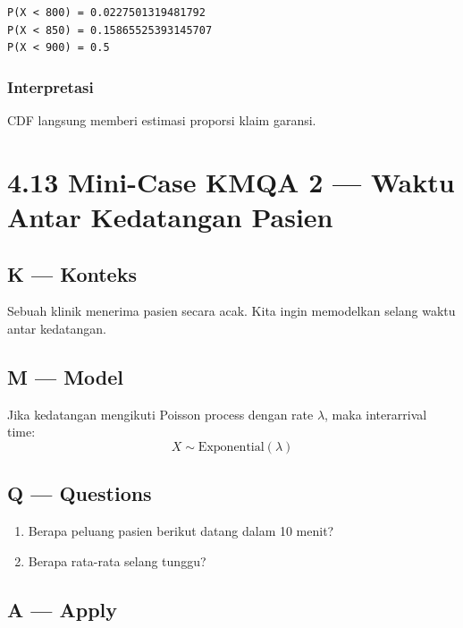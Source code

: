 \documentclass[
  letterpaper,
  DIV=11,
  numbers=noendperiod]{scrreprt}
\providecommand{\tightlist}{%
  \setlength{\itemsep}{0pt}\setlength{\parskip}{0pt}}
\begin{document}
\begin{verbatim}
P(X < 800) = 0.0227501319481792
P(X < 850) = 0.15865525393145707
P(X < 900) = 0.5
\end{verbatim}

\subsubsection{Interpretasi}\label{interpretasi-15}

CDF langsung memberi estimasi proporsi klaim garansi.

\section{4.13 Mini-Case KMQA 2 --- Waktu Antar Kedatangan
Pasien}\label{mini-case-kmqa-2-waktu-antar-kedatangan-pasien}

\subsection{K --- Konteks}\label{k-konteks-29}

Sebuah klinik menerima pasien secara acak. Kita ingin memodelkan selang
waktu antar kedatangan.

\subsection{M --- Model}\label{m-model-29}

Jika kedatangan mengikuti Poisson process dengan rate \(\lambda\), maka
interarrival time: \[
X \sim \mathrm{Exponential}(\lambda)
\]

\subsection{Q --- Questions}\label{q-questions-29}

\begin{enumerate}
\def\labelenumi{\arabic{enumi}.}
\tightlist
\item
  Berapa peluang pasien berikut datang dalam 10 menit?
\item
  Berapa rata-rata selang tunggu?
\end{enumerate}

\subsection{A --- Apply}\label{a-apply-29}
\end{document}
